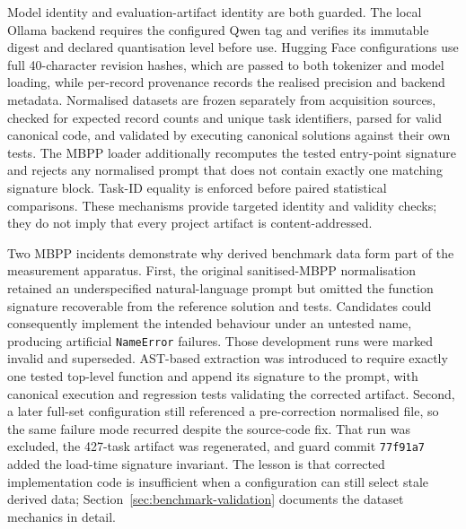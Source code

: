 Model identity and evaluation-artifact identity are both guarded. The local Ollama backend requires the configured Qwen tag and verifies its immutable digest and declared quantisation level before use. Hugging Face configurations use full 40-character revision hashes, which are passed to both tokenizer and model loading, while per-record provenance records the realised precision and backend metadata. Normalised datasets are frozen separately from acquisition sources, checked for expected record counts and unique task identifiers, parsed for valid canonical code, and validated by executing canonical solutions against their own tests. The MBPP loader additionally recomputes the tested entry-point signature and rejects any normalised prompt that does not contain exactly one matching signature block. Task-ID equality is enforced before paired statistical comparisons. These mechanisms provide targeted identity and validity checks; they do not imply that every project artifact is content-addressed.

Two MBPP incidents demonstrate why derived benchmark data form part of the measurement apparatus. First, the original sanitised-MBPP normalisation retained an underspecified natural-language prompt but omitted the function signature recoverable from the reference solution and tests. Candidates could consequently implement the intended behaviour under an untested name, producing artificial \texttt{NameError} failures. Those development runs were marked invalid and superseded. AST-based extraction was introduced to require exactly one tested top-level function and append its signature to the prompt, with canonical execution and regression tests validating the corrected artifact. Second, a later full-set configuration still referenced a pre-correction normalised file, so the same failure mode recurred despite the source-code fix. That run was excluded, the 427-task artifact was regenerated, and guard commit \texttt{77f91a7} added the load-time signature invariant. The lesson is that corrected implementation code is insufficient when a configuration can still select stale derived data; Section~\ref{sec:benchmark-validation} documents the dataset mechanics in detail.

